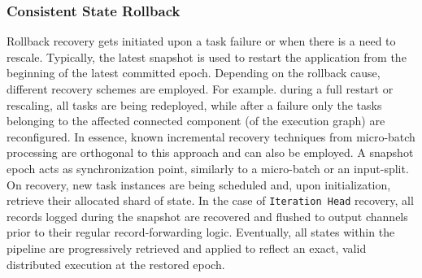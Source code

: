
\subsubsection{Consistent State Rollback}

Rollback recovery gets initiated upon a task failure or when there is a need to rescale. Typically, the latest snapshot is used to restart the application from the beginning of the latest committed epoch. Depending on the rollback cause, different recovery schemes are employed. For example. during a full restart or rescaling, all tasks are being redeployed, while after a failure only the tasks belonging to the affected connected component (of the execution graph) are reconfigured. In essence, known incremental recovery techniques from  micro-batch processing \cite{zaharia2012discretized} are orthogonal to this approach and can also be employed. A snapshot epoch acts as synchronization point, similarly to a micro-batch or an input-split. On recovery, new task instances are being scheduled and, upon initialization, retrieve their allocated shard of state. In the case of  \texttt{Iteration Head} recovery, all records logged during the snapshot are recovered and flushed to output channels prior to their regular record-forwarding logic. Eventually, all states within the pipeline are progressively retrieved and applied to reflect an exact, valid distributed execution at the restored epoch. 

